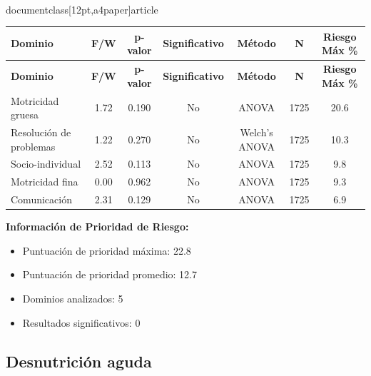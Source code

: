 \\documentclass[12pt,a4paper]{article}
\begin{document}
\begin{longtable}{|l|c|c|c|c|c|c|}
\hline
\textbf{Dominio} & \textbf{F/W} & \textbf{p-valor} & \textbf{Significativo} & \textbf{Método} & \textbf{N} & \textbf{Riesgo Máx \%} \\
\hline
\endfirsthead

\hline
\textbf{Dominio} & \textbf{F/W} & \textbf{p-valor} & \textbf{Significativo} & \textbf{Método} & \textbf{N} & \textbf{Riesgo Máx \%} \\
\hline
\endhead

\hline
\endfoot

\hline
\endlastfoot

Motricidad gruesa & 1.72 & 0.190 & No & ANOVA & 1725 & 20.6 \\
Resolución de problemas & 1.22 & 0.270 & No & Welch's ANOVA & 1725 & 10.3 \\
Socio-individual & 2.52 & 0.113 & No & ANOVA & 1725 & 9.8 \\
Motricidad fina & 0.00 & 0.962 & No & ANOVA & 1725 & 9.3 \\
Comunicación & 2.31 & 0.129 & No & ANOVA & 1725 & 6.9 \\

\end{longtable}


\textbf{Información de Prioridad de Riesgo:}
\begin{itemize}
\item Puntuación de prioridad máxima: 22.8
\item Puntuación de prioridad promedio: 12.7
\item Dominios analizados: 5
\item Resultados significativos: 0
\end{itemize}


\subsection{Desnutrición aguda}
\end{document}
